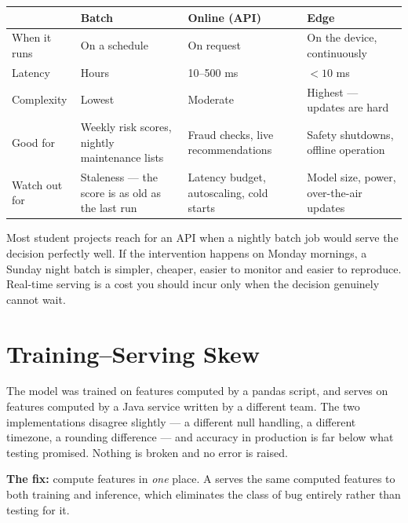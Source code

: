 \begin{longtable}{@{}L{2.5cm}L{3.7cm}L{3.5cm}L{4.4cm}@{}}
\toprule
{}
& \textbf{Batch} & \textbf{Online (API)} & \textbf{Edge} \\
\midrule
\endhead
When it runs & On a schedule & On request & On the device, continuously \\
Latency & Hours & 10--500 ms & $<10$ ms \\
Complexity & Lowest & Moderate & Highest --- updates are hard \\
Good for & Weekly risk scores, nightly maintenance lists & Fraud checks, live recommendations & Safety shutdowns, offline operation \\
Watch out for & Staleness --- the score is as old as the last run & Latency budget, autoscaling, cold starts & Model size, power, over-the-air updates \\
\bottomrule
\end{longtable}

\begin{conceptbox}
Most student projects reach for an API when a nightly batch job would serve the
decision perfectly well. If the intervention happens on Monday mornings, a Sunday
night batch is simpler, cheaper, easier to monitor and easier to reproduce.
Real-time serving is a cost you should incur only when the decision genuinely
cannot wait.
\end{conceptbox}

\section{Training--Serving Skew}

\begin{alertbox}
The model was trained on features computed by a pandas script, and serves on
features computed by a Java service written by a different team. The two
implementations disagree slightly --- a different null handling, a different
timezone, a rounding difference --- and accuracy in production is far below what
testing promised. Nothing is broken and no error is raised.

\textbf{The fix:} compute features in \emph{one} place. A 
serves the same computed features to both training and inference, which eliminates
the class of bug entirely rather than testing for it.
\end{alertbox}

